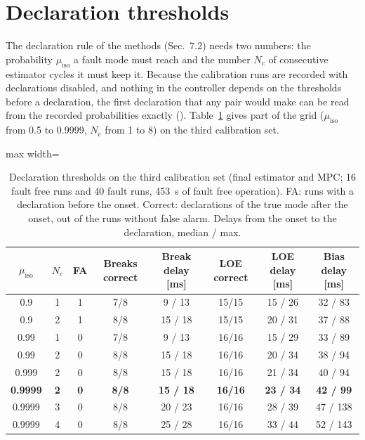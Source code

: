 \documentclass[10pt]{article}
\begin{document}
\section{Declaration thresholds}\label{sec:roc}

The declaration rule of the methods (Sec.~7.2) needs two numbers: the probability $\mu_{\mathrm{iso}}$ a fault mode must reach and the number $N_c$ of consecutive estimator cycles it must keep it. Because the calibration runs are recorded with declarations disabled, and nothing in the controller depends on the thresholds before a declaration, the first declaration that any pair would make can be read from the recorded probabilities exactly (). Table~\ref{tab:roc} gives part of the grid ($\mu_{\mathrm{iso}}$ from 0.5 to 0.9999, $N_c$ from 1 to 8) on the third calibration set.

\begin{table}[h]
\centering\small
\caption{Declaration thresholds on the third calibration set (final estimator and MPC; 16 fault free runs and 40 fault runs, 453~s of fault free operation). FA: runs with a declaration before the onset. Correct: declarations of the true mode after the onset, out of the runs without false alarm. Delays from the onset to the declaration, median / max.}\label{tab:roc}
\begin{adjustbox}{max width=\linewidth}\begin{tabular}{@{}cccccccc@{}}
\toprule
$\mu_{\mathrm{iso}}$ & $N_c$ & FA & Breaks correct & Break delay [ms] & LOE correct & LOE delay [ms] & Bias delay [ms] \\
\midrule
0.9 & 1 & 1 & 7/8 & 9 / 13 & 15/15 & 15 / 26 & 32 / 83 \\
0.9 & 2 & 1 & 8/8 & 15 / 18 & 15/15 & 20 / 31 & 37 / 88 \\
0.99 & 1 & 0 & 7/8 & 9 / 13 & 16/16 & 15 / 29 & 33 / 89 \\
0.99 & 2 & 0 & 8/8 & 15 / 18 & 16/16 & 20 / 34 & 38 / 94 \\
0.999 & 2 & 0 & 8/8 & 15 / 18 & 16/16 & 21 / 34 & 40 / 94 \\
\textbf{0.9999} & \textbf{2} & \textbf{0} & \textbf{8/8} & \textbf{15 / 18} & \textbf{16/16} & \textbf{23 / 34} & \textbf{42 / 99} \\
0.9999 & 3 & 0 & 8/8 & 20 / 23 & 16/16 & 28 / 39 & 47 / 138 \\
0.9999 & 4 & 0 & 8/8 & 25 / 28 & 16/16 & 33 / 44 & 52 / 143 \\
\bottomrule
\end{tabular}\end{adjustbox}
\end{table}
\end{document}
